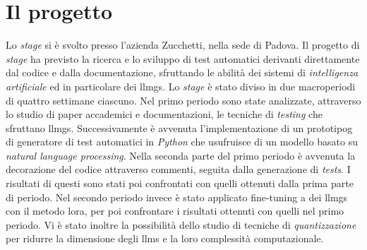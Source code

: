 \section{Il progetto}
Lo \textit{stage} si è svolto presso l'azienda Zucchetti, nella sede di Padova. Il progetto di \textit{stage} ha previsto la ricerca e lo sviluppo di test automatici derivanti direttamente dal codice e dalla documentazione, sfruttando le abilità dei sistemi di \textit{intelligenza artificiale} ed in particolare dei \glspl{llmg}.
Lo \textit{stage} è stato diviso in due macroperiodi di quattro settimane ciascuno. Nel primo periodo sono state analizzate, attraverso lo studio di paper accademici e documentazioni, le tecniche di \textit{testing} che sfruttano \glspl{llmg}. Successivamente è avvenuta l'implementazione di un \gls{prototipog} di generatore di test automatici in \textit{Python} che usufruisce di un modello basato su \textit{natural language processing}. Nella seconda parte del primo periodo è avvenuta la decorazione del codice attraverso commenti, seguita dalla generazione di \textit{tests}. I risultati di questi sono stati poi confrontati con quelli ottenuti dalla prima parte di periodo. Nel secondo periodo invece è stato applicato \gls{fine-tuning} a dei \glspl{llmg} con il metodo \gls{lora}, per poi confrontare i risultati ottenuti con quelli nel primo periodo.
Vi è stato inoltre la possibilità dello studio di tecniche di \textit{quantizzazione} per ridurre la dimensione degli \glspl{llm} e la loro complessità computazionale.
